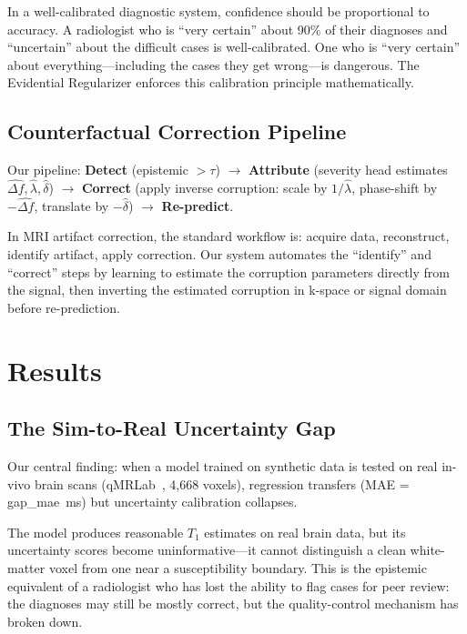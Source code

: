 \documentclass[11pt,a4paper]{article}
\begin{document}
\begin{intuition}
In a well-calibrated diagnostic system, confidence should be proportional to accuracy. A radiologist who is ``very certain'' about 90\% of their diagnoses and ``uncertain'' about the difficult cases is well-calibrated. One who is ``very certain'' about everything---including the cases they get wrong---is dangerous. The Evidential Regularizer enforces this calibration principle mathematically.
\end{intuition}

\subsection{Counterfactual Correction Pipeline}

Our pipeline: \textbf{Detect} (epistemic $> \tau$) $\to$ \textbf{Attribute} (severity head estimates $\hat{\Delta f}, \hat{\lambda}, \hat{\delta}$) $\to$ \textbf{Correct} (apply inverse corruption: scale by $1/\hat{\lambda}$, phase-shift by $-\hat{\Delta f}$, translate by $-\hat{\delta}$) $\to$ \textbf{Re-predict}.

\begin{intuition}
In MRI artifact correction, the standard workflow is: acquire data, reconstruct, identify artifact, apply correction. Our system automates the ``identify'' and ``correct'' steps by learning to estimate the corruption parameters directly from the signal, then inverting the estimated corruption in k-space or signal domain before re-prediction.
\end{intuition}

\section{Results}
\label{sec:results}

\subsection{The Sim-to-Real Uncertainty Gap}

Our central finding: when a model trained on synthetic data is tested on real in-vivo brain scans (qMRLab~\citep{qmrlab}, 4,668 voxels), regression transfers (MAE = {{gap_mae}}~ms) but uncertainty calibration collapses.

\begin{intuition}
The model produces reasonable $T_1$ estimates on real brain data, but its uncertainty scores become uninformative---it cannot distinguish a clean white-matter voxel from one near a susceptibility boundary. This is the epistemic equivalent of a radiologist who has lost the ability to flag cases for peer review: the diagnoses may still be mostly correct, but the quality-control mechanism has broken down.
\end{intuition}
\end{document}
